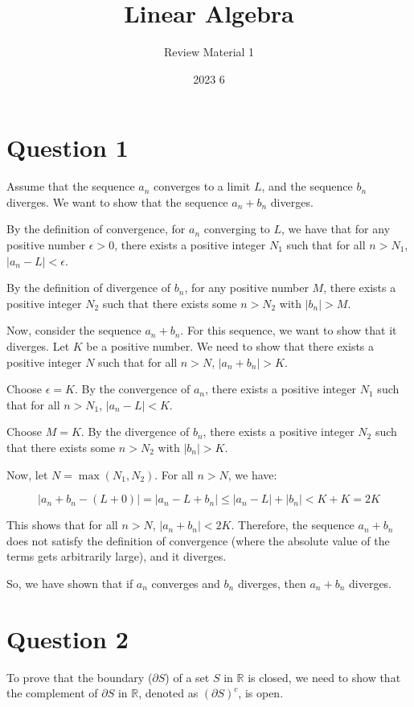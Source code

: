\documentclass[12pt]{article}
\title{Linear Algebra}
\author{Review Material 1}
\date{2023 6}
\begin{document}
\doublespacing

\section*{Question 1}


Assume that the sequence \( a_n \) converges to a limit \( L \), and the sequence \( b_n \) diverges. We want to show that the sequence \( a_n + b_n \) diverges.

By the definition of convergence, for \( a_n \) converging to \( L \), we have that for any positive number \( \epsilon > 0 \), there exists a positive integer \( N_1 \) such that for all \( n > N_1 \), \( |a_n - L| < \epsilon \).

By the definition of divergence of \( b_n \), for any positive number \( M \), there exists a positive integer \( N_2 \) such that there exists some \( n > N_2 \) with \( |b_n| > M \).

Now, consider the sequence \( a_n + b_n \). For this sequence, we want to show that it diverges. Let \( K \) be a positive number. We need to show that there exists a positive integer \( N \) such that for all \( n > N \), \( |a_n + b_n| > K \).

Choose \( \epsilon = K \). By the convergence of \( a_n \), there exists a positive integer \( N_1 \) such that for all \( n > N_1 \), \( |a_n - L| < K \).

Choose \( M = K \). By the divergence of \( b_n \), there exists a positive integer \( N_2 \) such that there exists some \( n > N_2 \) with \( |b_n| > K \).

Now, let \( N = \max(N_1, N_2) \). For all \( n > N \), we have:

\[ |a_n + b_n - (L + 0)| = |a_n - L + b_n| \leq |a_n - L| + |b_n| < K + K = 2K \]

This shows that for all \( n > N \), \( |a_n + b_n| < 2K \). Therefore, the sequence \( a_n + b_n \) does not satisfy the definition of convergence (where the absolute value of the terms gets arbitrarily large), and it diverges.

So, we have shown that if \( a_n \) converges and \( b_n \) diverges, then \( a_n + b_n \) diverges.




\newpage
\section*{Question 2}
To prove that the boundary (\(\partial S\)) of a set \(S\) in \(\mathbb{R}\) is closed, we need to show that the complement of \(\partial S\) in \(\mathbb{R}\), denoted as \((\partial S)^c\), is open.
\end{document}
